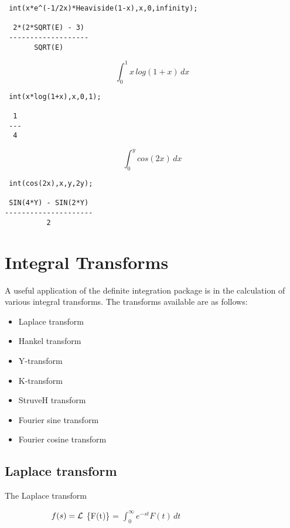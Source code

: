 \begin{verbatim}
 int(x*e^(-1/2x)*Heaviside(1-x),x,0,infinity);

  2*(2*SQRT(E) - 3)
 -------------------
       SQRT(E)
\end{verbatim}

\begin{displaymath}
\int_{0}^{1} x \,log(1+x) \,dx
\end{displaymath}

\begin{verbatim}
 int(x*log(1+x),x,0,1);

  1
 ---
  4
\end{verbatim}

\begin{displaymath}
\int_{0}^{y} cos(2x) \,dx
\end{displaymath}

\begin{verbatim}
 int(cos(2x),x,y,2y);

 SIN(4*Y) - SIN(2*Y)
---------------------
          2
\end{verbatim}


\section{Integral Transforms}

A useful application of the definite integration package is in the 
calculation of various integral transforms. The transforms
available are as follows:

\begin{itemize}
\item Laplace transform 
\item Hankel transform 
\item Y-transform 
\item K-transform 
\item StruveH transform 
\item Fourier sine transform
\item Fourier cosine transform 
\end{itemize}

\subsection{Laplace transform}

The Laplace transform

$\hspace{20 mm} f(s) = \cal L$ \{F(t)\} =
$\int_{0}^{\infty} e^{-st}F(t)\,dt$


